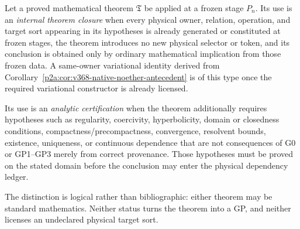 \documentclass[12pt,a4paper]{article}
\begin{document}
\begin{definition}
\label{p2a:def:v368-theorem-closure-status}
Let a proved mathematical theorem \(\mathfrak T\) be applied at a frozen stage
\(P_n\).  Its use is an \emph{internal theorem closure} when every physical
owner, relation, operation, and target sort appearing in its hypotheses is
already generated or constituted at frozen stages, the theorem introduces no
new physical selector or token, and its conclusion is obtained only by
ordinary mathematical implication from those frozen data.  A same-owner
variational identity derived from
Corollary~\ref{p2a:cor:v368-native-noether-antecedent} is of this type once the
required variational constructor is already licensed.

Its use is an \emph{analytic certification} when the theorem additionally
requires hypotheses such as regularity, coercivity, hyperbolicity, domain or
closedness conditions, compactness/precompactness, convergence, resolvent
bounds, existence, uniqueness, or continuous dependence that are not
consequences of G0 or GP1--GP3 merely from correct provenance.  Those
hypotheses must be proved on the stated domain before the conclusion may enter
the physical dependency ledger.

The distinction is logical rather than bibliographic: either theorem may be
standard mathematics.  Neither status turns the theorem into a GP, and neither
licenses an undeclared physical target sort.
\end{definition}
\end{document}
